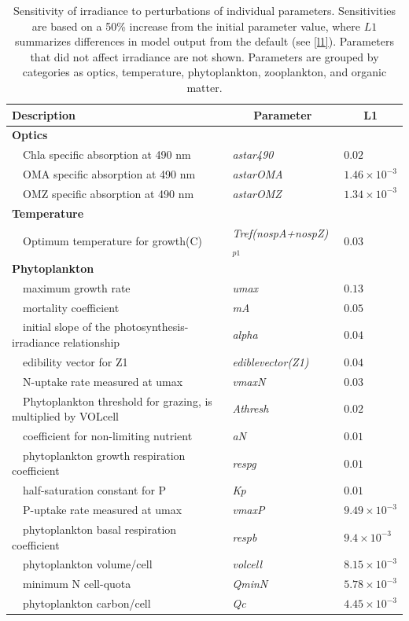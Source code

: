 \documentclass[letterpaper,12pt,oneside]{article}\usepackage[]{graphicx}\usepackage[]{color}
\begin{document}
\begin{table}[!tbp]
{\footnotesize
\caption{Sensitivity of irradiance to perturbations of individual parameters.  Sensitivities are based on a 50\% increase from the initial parameter value, where $L1$ summarizes differences in model output from the default (see \cref{l1}).  Parameters that did not affect irradiance are not shown.  Parameters are grouped by categories as optics, temperature, phytoplankton, zooplankton, and organic matter.\label{tab:irrsens}} 
\begin{center}
\begin{tabular}{lll}
\hline\hline
\multicolumn{1}{l}{Description}&\multicolumn{1}{c}{Parameter}&\multicolumn{1}{c}{L1}\tabularnewline
\hline
{\bfseries Optics}&&\tabularnewline
~~Chla specific absorption at 490 nm&\textit{astar490}&$0.02$\tabularnewline
~~OMA specific absorption at 490 nm&\textit{astarOMA}&$1.46\times 10^{-3}$\tabularnewline
~~OMZ specific absorption at 490 nm&\textit{astarOMZ}&$1.34\times 10^{-3}$\tabularnewline
\hline
{\bfseries Temperature}&&\tabularnewline
~~Optimum temperature for growth(C)&\textit{Tref(nospA+nospZ)$_{p1}$}&$0.03$\tabularnewline
\hline
{\bfseries Phytoplankton}&&\tabularnewline
~~maximum growth rate&\textit{umax}&$0.13$\tabularnewline
~~mortality coefficient&\textit{mA}&$0.05$\tabularnewline
~~initial slope of the photosynthesis-irradiance relationship&\textit{alpha}&$0.04$\tabularnewline
~~edibility vector for Z1&\textit{ediblevector(Z1)}&$0.04$\tabularnewline
~~N-uptake rate measured at umax&\textit{vmaxN}&$0.03$\tabularnewline
~~Phytoplankton threshold for grazing, is multiplied by VOLcell&\textit{Athresh}&$0.02$\tabularnewline
~~coefficient for non-limiting nutrient&\textit{aN}&$0.01$\tabularnewline
~~phytoplankton growth respiration coefficient&\textit{respg}&$0.01$\tabularnewline
~~half-saturation constant for P&\textit{Kp}&$0.01$\tabularnewline
~~P-uptake rate measured at umax&\textit{vmaxP}&$9.49\times 10^{-3}$\tabularnewline
~~phytoplankton basal respiration coefficient&\textit{respb}&$9.4\times 10^{-3}$\tabularnewline
~~phytoplankton volume/cell&\textit{volcell}&$8.15\times 10^{-3}$\tabularnewline
~~minimum N cell-quota&\textit{QminN}&$5.78\times 10^{-3}$\tabularnewline
~~phytoplankton carbon/cell&\textit{Qc}&$4.45\times 10^{-3}$\tabularnewline

\end{tabular}
\end{center}}
\end{table}
\end{document}
